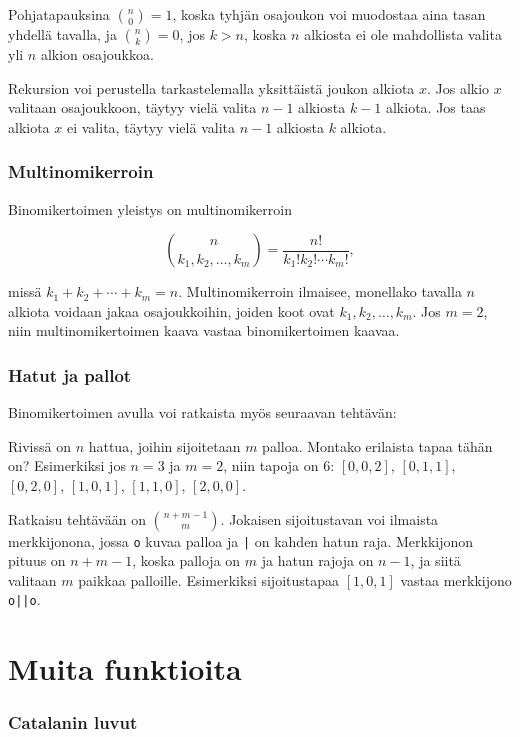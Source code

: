 Pohjatapauksina ${n \choose 0} = 1$,
koska tyhjän osajoukon voi muodostaa aina tasan yhdellä tavalla,
ja ${n \choose k} = 0$, jos $k>n$,
koska $n$ alkiosta ei ole mahdollista valita
yli $n$ alkion osajoukkoa.

Rekursion voi perustella tarkastelemalla yksittäistä
joukon alkiota $x$. Jos alkio $x$ valitaan osajoukkoon,
täytyy vielä valita $n-1$ alkiosta $k-1$ alkiota.
Jos taas alkiota $x$ ei valita,
täytyy vielä valita $n-1$ alkiosta $k$ alkiota.

\subsubsection*{Multinomikerroin}

Binomikertoimen yleistys on multinomikerroin

\[ {n \choose k_1,k_2,\ldots,k_m} = \frac{n!}{k_1! k_2! \cdots k_m!}, \]

missä $k_1+k_2+\cdots+k_m=n$.
Multinomikerroin ilmaisee, monellako tavalla $n$ alkiota voidaan jakaa osajoukkoihin,
joiden koot ovat $k_1,k_2,\ldots,k_m$.
Jos $m=2$, niin multinomikertoimen kaava vastaa binomikertoimen kaavaa.

\subsubsection*{Hatut ja pallot}

Binomikertoimen avulla voi ratkaista myös seuraavan tehtävän:

\begin{task}
Rivissä on $n$ hattua, joihin sijoitetaan $m$ palloa.
Montako erilaista tapaa tähän on?
Esimerkiksi jos $n=3$ ja $m=2$, niin tapoja on 6:
$[0,0,2]$, $[0,1,1]$, $[0,2,0]$, $[1,0,1]$, $[1,1,0]$,
$[2,0,0]$.
\end{task}

\noindent
Ratkaisu tehtävään on ${n+m-1 \choose m}$.
Jokaisen sijoitustavan voi ilmaista merkkijonona, jossa \texttt{o}
kuvaa palloa ja \texttt{|} on kahden hatun raja.
Merkkijonon pituus on $n+m-1$, koska palloja on $m$
ja hatun rajoja on $n-1$,
ja siitä valitaan $m$ paikkaa palloille.
Esimerkiksi sijoitustapaa $[1,0,1]$
vastaa merkkijono \texttt{o||o}.

\section{Muita funktioita}

\subsubsection*{Catalanin luvut}

